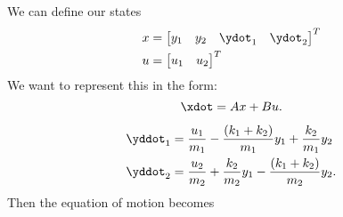 \documentclass[10pt]{article}
\begin{document}
We can define our states
\begin{equation}
  \begin{split}
    x &=
    \begin{bmatrix}
      y_1 & y_2 & \ydot_1 & \ydot_2
    \end{bmatrix}^T\\
    u &=
    \begin{bmatrix}
      u_1 & u_2
    \end{bmatrix}^T    
  \end{split}
\end{equation}
We want to represent this in the form:
\begin{equation}
  \xdot = Ax + Bu.
\end{equation}

\begin{equation}
  \begin{split}
    \yddot_1 &= \frac{u_1}{m_1} - \frac{(k_1 + k_2)}{m_1}y_1 +
    \frac{k_2}{m_1}y_2\\ 
    \yddot_2 &= \frac{u_2}{m_2} + \frac{k_2}{m_2} y_1 - \frac{(k_1 +
      k_2)}{m_2} y_2.
  \end{split}
\end{equation}
Then the equation of motion becomes
\end{document}
